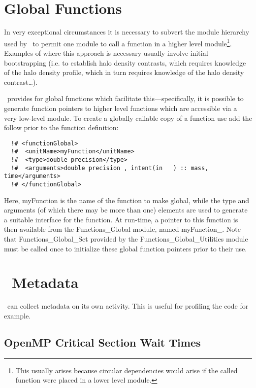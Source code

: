 \section{Global Functions}

In very exceptional circumstances it is necessary to subvert the module hierarchy used by \glc\ to permit one module to call a function in a higher level module\footnote{This usually arises because circular dependencies would arise if the called function were placed in a lower level module.}. Examples of where this approach is necessary usually involve initial bootstrapping (i.e. to establish halo density contrasts, which requires knowledge of the halo density profile, which in turn requires knowledge of the halo density contrast\ldots).

\glc\ provides for global functions which facilitate this---specifically, it is possible to generate function pointers to higher level functions which are accessible via a very low-level module. To create a globally callable copy of a function use add the follow prior to the function definition:
\begin{verbatim}
  !# <functionGlobal>
  !#  <unitName>myFunction</unitName>
  !#  <type>double precision</type>
  !#  <arguments>double precision , intent(in   ) :: mass, time</arguments>
  !# </functionGlobal>
\end{verbatim}
Here, {\normalfont \ttfamily myFunction} is the name of the function to make global, while the {\normalfont \ttfamily type} and {\normalfont \ttfamily arguments} (of which there may be more than one) elements are used to generate a suitable interface for the function. At run-time, a pointer to this function is then available from the {\normalfont \ttfamily Functions\_Global} module, named {\normalfont \ttfamily myFunction\_}. Note that {\normalfont \ttfamily Functions\_Global\_Set} provided by the {\normalfont \ttfamily Functions\_Global\_Utilities} module must be called once to initialize these global function pointers prior to their use.

\section{\glc\ Metadata}

\glc\ can collect metadata on its own activity. This is useful for profiling the code for example.

\subsection{OpenMP Critical Section Wait Times}

